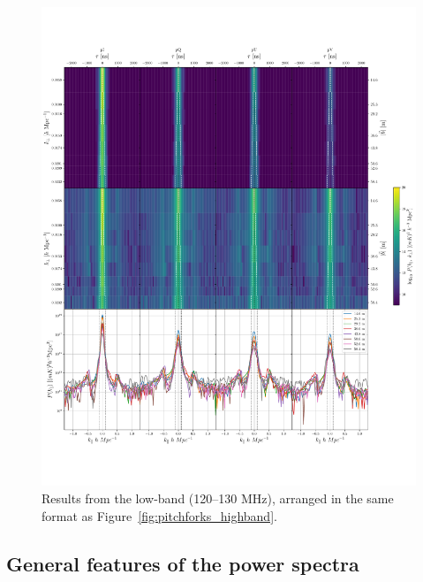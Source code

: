 \documentclass[twocolumn, trackchanges]{aastex61}
\begin{document}
\begin{figure}[h]
\centering
\includegraphics[scale=0.45]{lowband_8day_LST_105_230.pdf}
\caption{Results from the low-band (120--130 MHz), arranged in the same format
  as Figure~\ref{fig:pitchforks_highband}.}
\label{fig:pitchforks_lowband}
\end{figure}

\subsection{General features of the power spectra}
\label{subsec:general_features}
\end{document}
